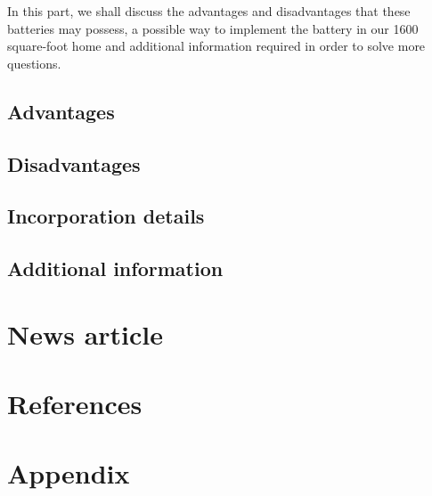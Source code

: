 \documentclass[12pt]{article}
\begin{document}
In this part, we shall discuss the advantages and disadvantages that these batteries may possess, a possible way to implement the battery in our 1600 square-foot home and additional information required in order to solve more questions.
\subsection{Advantages}

\subsection{Disadvantages}

\subsection{Incorporation details}

\subsection{Additional information}


\section{News article}
\newpage


\pagestyle{fancy}
\newpage
\section{References}


\newpage
\section{Appendix}

\end{document}
